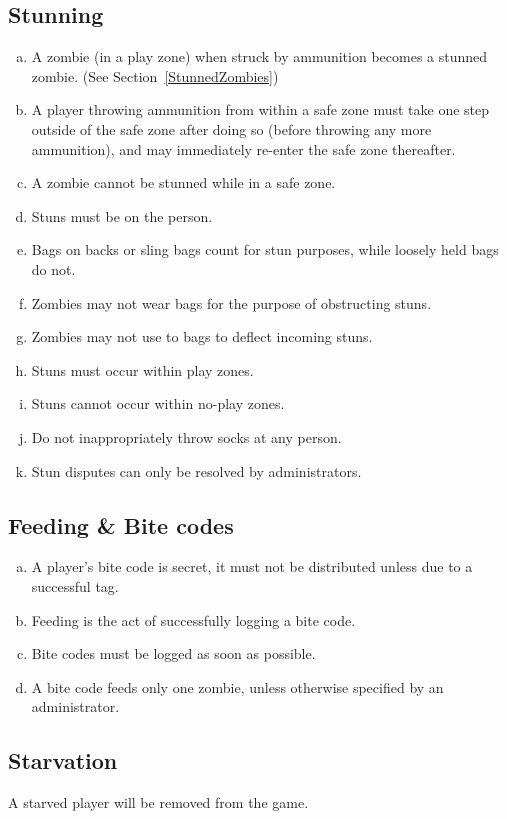 \documentclass[a4paper,12pt]{article}
\begin{document}
\subsection{Stunning}

\begin{enumerate}[(a)]
    \item A zombie (in a play zone) when struck by ammunition becomes a stunned zombie. (See Section~\ref{StunnedZombies})
    \item A player throwing ammunition from within a safe zone must take one step outside of the safe zone after doing so (before throwing any more ammunition), and may immediately re-enter the safe zone thereafter.
    \item A zombie cannot be stunned while in a safe zone.
    \item Stuns must be on the person.
    \item Bags on backs or sling bags count for stun purposes, while loosely held bags do not. 
    \item Zombies may not wear bags for the purpose of obstructing stuns.
    \item Zombies may not use to bags to deflect incoming stuns.
    \item Stuns must occur within play zones.
    \item Stuns cannot occur within no-play zones.
    \item Do not inappropriately throw socks at any person.
    \item Stun disputes can only be resolved by administrators.
\end{enumerate}

\subsection{Feeding \& Bite codes}

\begin{enumerate}[(a)]
    \item A player's bite code is secret, it must not be distributed unless due to a successful tag.
    \item Feeding is the act of successfully logging a bite code.
    \item Bite codes must be logged as soon as possible.
    \item A bite code feeds only one zombie, unless otherwise specified by an administrator.
\end{enumerate}

\subsection{Starvation}
A starved player will be removed from the game.
\end{document}
